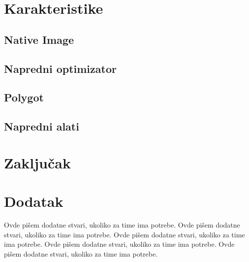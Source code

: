 \documentclass[a4paper]{article}
\begin{document}
\section{Karakteristike}
\label{sec:Karakteristike}

\subsection{Native Image}
\label{sub:Native Image}

\subsection{Napredni optimizator}
\label{sub:Napredni optimizator}

\subsection{Polygot}
\label{sub:Polygot}


\subsection{Napredni alati}
\label{sub:Napredni alati}

\section{Zaključak}
\label{sec:zakljucak}

\appendix
 


\appendix
\section{Dodatak}
Ovde pišem dodatne stvari, ukoliko za time ima potrebe.
Ovde pišem dodatne stvari, ukoliko za time ima potrebe.
Ovde pišem dodatne stvari, ukoliko za time ima potrebe.
Ovde pišem dodatne stvari, ukoliko za time ima potrebe.
Ovde pišem dodatne stvari, ukoliko za time ima potrebe.
\end{document}
